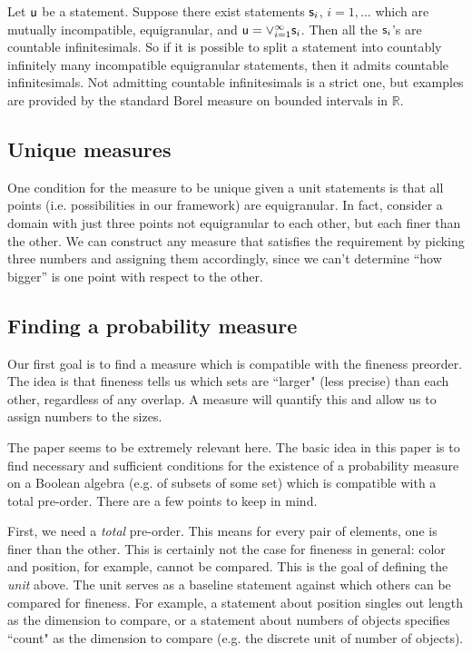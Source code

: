 \documentclass[10pt, onecolumn, nofootinbib]{revtex4-1}
\begin{document}
Let $\stmt[u]$ be a statement. Suppose there exist statements $\stmt_i$, $i=1,\ldots$ which are mutually incompatible, equigranular, and $\stmt[u] = \OR_{i=1}^{\infty}\stmt_i$. Then all the $\stmt_i$'s are countable infinitesimals. So if it is possible to split a statement into countably infinitely many incompatible equigranular statements, then it admits countable infinitesimals. Not admitting countable infinitesimals is a strict one, but examples are provided by the standard Borel measure on bounded intervals in $\mathbb{R}$. 



\subsection{Unique measures}

One condition for the measure to be unique given a unit statements is that all points (i.e. possibilities in our framework) are equigranular. In fact, consider a domain with just three points not equigranular to each other, but each finer than the other. We can construct any measure that satisfies the requirement by picking three numbers and assigning them accordingly, since we can't determine ``how bigger'' is one point with respect to the other.

\subsection{Finding a probability measure}

Our first goal is to find a measure which is compatible with the fineness preorder. The idea is that fineness tells us which sets are ``larger" (less precise) than each other, regardless of any overlap.  A measure will quantify this and allow us to assign numbers to the sizes.

The paper \cite{probexistence} seems to be extremely relevant here. The basic idea in this paper is to find necessary and sufficient conditions for the existence of a probability measure on a Boolean algebra (e.g. of subsets of some set) which is compatible with a total pre-order. There are a few points to keep in mind. 

First, we need a \emph{total} pre-order. This means for every pair of elements, one is finer than the other. This is certainly not the case for fineness in general: color and position, for example, cannot be compared. This is the goal of defining the \emph{unit} above. The unit serves as a baseline statement against which others can be compared for fineness. For example, a statement about position singles out length as the dimension to compare, or a statement about numbers of objects specifies ``count" as the dimension to compare (e.g. the discrete unit of number of objects). 
\end{document}
